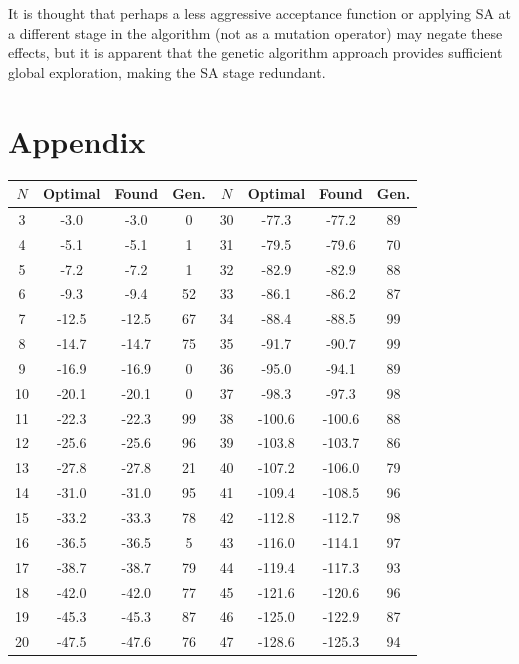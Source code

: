 \documentclass{article}
\begin{document}
It is thought that perhaps a less aggressive acceptance function or applying SA
at a different stage in the algorithm (not as a mutation operator) may negate
these effects, but it is apparent that the genetic algorithm approach provides
sufficient global exploration, making the SA stage redundant.

\section{Appendix}

\begin{table}[]
	\label {tab:nosa}
	\centering
	\begin{tabular}{cccc|cccc}
	$N$  & Optimal & Found & Gen. & $N$  & Optimal & Found  & Gen. \\
	\hline
	3  & -3.0    & -3.0  & 0    & 30 & -77.3   & -77.2  & 89   \\
	4  & -5.1    & -5.1  & 1    & 31 & -79.5   & -79.6  & 70   \\
	5  & -7.2    & -7.2  & 1    & 32 & -82.9   & -82.9  & 88   \\
	6  & -9.3    & -9.4  & 52   & 33 & -86.1   & -86.2  & 87   \\
	7  & -12.5   & -12.5 & 67   & 34 & -88.4   & -88.5  & 99   \\
	8  & -14.7   & -14.7 & 75   & 35 & -91.7   & -90.7  & 99   \\
	9  & -16.9   & -16.9 & 0    & 36 & -95.0   & -94.1  & 89   \\
	10 & -20.1   & -20.1 & 0    & 37 & -98.3   & -97.3  & 98   \\
	11 & -22.3   & -22.3 & 99   & 38 & -100.6  & -100.6 & 88   \\
	12 & -25.6   & -25.6 & 96   & 39 & -103.8  & -103.7 & 86   \\
	13 & -27.8   & -27.8 & 21   & 40 & -107.2  & -106.0 & 79   \\
	14 & -31.0   & -31.0 & 95   & 41 & -109.4  & -108.5 & 96   \\
	15 & -33.2   & -33.3 & 78   & 42 & -112.8  & -112.7 & 98   \\
	16 & -36.5   & -36.5 & 5    & 43 & -116.0  & -114.1 & 97   \\
	17 & -38.7   & -38.7 & 79   & 44 & -119.4  & -117.3 & 93   \\
	18 & -42.0   & -42.0 & 77   & 45 & -121.6  & -120.6 & 96   \\
	19 & -45.3   & -45.3 & 87   & 46 & -125.0  & -122.9 & 87   \\
	20 & -47.5   & -47.6 & 76   & 47 & -128.6  & -125.3 & 94   \\

\end{tabular}
\end{table}
\end{document}
